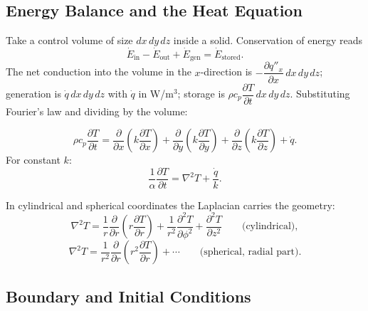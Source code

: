 \subsection*{Energy Balance and the Heat Equation}

Take a control volume of size $dx\,dy\,dz$ inside a solid. Conservation of energy reads
\[
\dot E_{\text{in}} - \dot E_{\text{out}} + \dot E_{\text{gen}} = \dot E_{\text{stored}} .
\]
The net conduction into the volume in the $x$-direction is $-\dfrac{\partial q''_x}{\partial x}\,dx\,dy\,dz$; generation is $\dot q\,dx\,dy\,dz$ with $\dot q$ in W/m$^3$; storage is $\rho c_p \dfrac{\partial T}{\partial t}\,dx\,dy\,dz$. Substituting Fourier's law and dividing by the volume:

\begin{definition}
\[
\rho c_p \frac{\partial T}{\partial t}
= \frac{\partial}{\partial x}\!\left(k \frac{\partial T}{\partial x}\right)
+ \frac{\partial}{\partial y}\!\left(k \frac{\partial T}{\partial y}\right)
+ \frac{\partial}{\partial z}\!\left(k \frac{\partial T}{\partial z}\right)
+ \dot q .
\]
For constant $k$:
\[
\frac{1}{\alpha}\frac{\partial T}{\partial t} = \nabla^2 T + \frac{\dot q}{k}.
\]
\end{definition}

In cylindrical and spherical coordinates the Laplacian carries the geometry:
\[
\nabla^2 T = \frac{1}{r}\frac{\partial}{\partial r}\!\left(r\frac{\partial T}{\partial r}\right) + \frac{1}{r^2}\frac{\partial^2 T}{\partial \phi^2} + \frac{\partial^2 T}{\partial z^2}
\qquad\text{(cylindrical)},
\]
\[
\nabla^2 T = \frac{1}{r^2}\frac{\partial}{\partial r}\!\left(r^2\frac{\partial T}{\partial r}\right) + \cdots
\qquad\text{(spherical, radial part)}.
\]

\subsection*{Boundary and Initial Conditions}

